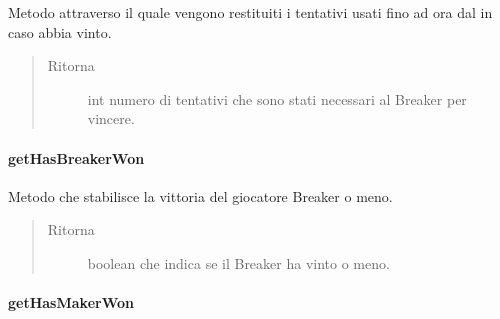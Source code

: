 \documentclass[letterpaper,10pt,italian,openany,oneside]{sphinxmanual}
\begin{document}
\begin{fulllineitems}
\label{\detokenize{test/it/unicam/cs/pa/mastermind/gamecore/MatchState:it.unicam.cs.pa.mastermind.gamecore.MatchState.getBreakerVictoryAttempts()}}
Metodo attraverso il quale vengono restituiti i tentativi usati fino ad ora dal  in caso abbia vinto.
\begin{quote}\begin{description}
\item[{Ritorna}] \leavevmode
int numero di tentativi che sono stati necessari al Breaker per vincere.

\end{description}\end{quote}

\end{fulllineitems}



\paragraph{getHasBreakerWon}
\label{\detokenize{test/it/unicam/cs/pa/mastermind/gamecore/MatchState:gethasbreakerwon}}

\begin{fulllineitems}
\label{\detokenize{test/it/unicam/cs/pa/mastermind/gamecore/MatchState:it.unicam.cs.pa.mastermind.gamecore.MatchState.getHasBreakerWon()}}
Metodo che stabilisce la vittoria del giocatore Breaker o meno.
\begin{quote}\begin{description}
\item[{Ritorna}] \leavevmode
boolean che indica se il Breaker ha vinto o meno.

\end{description}\end{quote}

\end{fulllineitems}



\paragraph{getHasMakerWon}
\label{\detokenize{test/it/unicam/cs/pa/mastermind/gamecore/MatchState:gethasmakerwon}}
\end{document}
